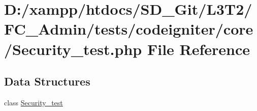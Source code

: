 \hypertarget{_security__test_8php}{}\section{D\+:/xampp/htdocs/\+S\+D\+\_\+\+Git/\+L3\+T2/\+F\+C\+\_\+\+Admin/tests/codeigniter/core/\+Security\+\_\+test.php File Reference}
\label{_security__test_8php}
\subsection*{Data Structures}
\begin{DoxyCompactItemize}
\item 
class \hyperlink{class_security__test}{Security\+\_\+test}
\end{DoxyCompactItemize}

